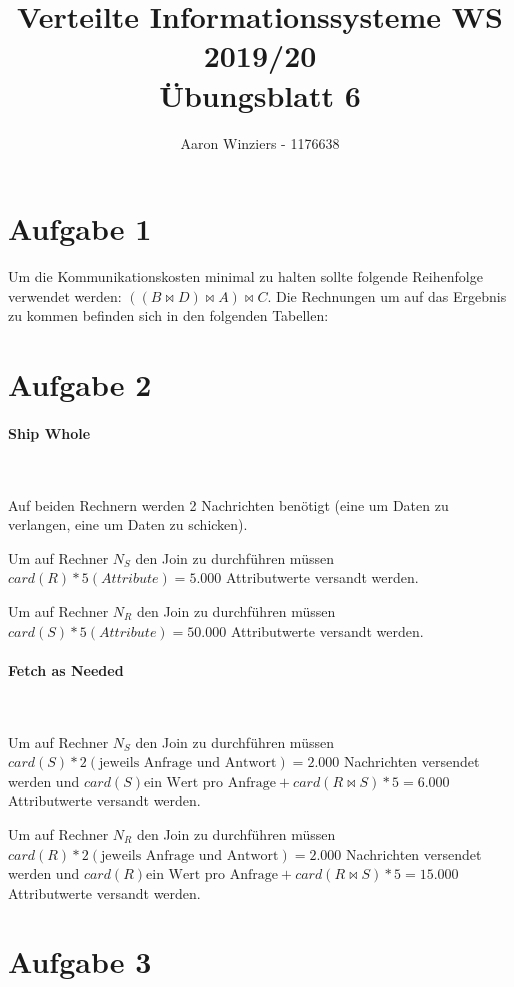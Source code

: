 \documentclass[11pt,a4paper,parskip=half ]{scrartcl}
\author{Aaron Winziers - 1176638}
\title{Verteilte Informationssysteme WS 2019/20\\\LARGE{Übungsblatt 6}}
\begin{document}
	\maketitle
\section*{Aufgabe 1}
	Um die Kommunikationskosten minimal zu halten sollte folgende Reihenfolge verwendet werden: $((B\bowtie D)\bowtie A)\bowtie C$. Die Rechnungen um auf das Ergebnis zu kommen befinden sich in den folgenden Tabellen:
	\begin{landscape}
		\begin{center}
			
		\end{center}
	\end{landscape}


\section*{Aufgabe 2}
\paragraph{Ship Whole}~

	Auf beiden Rechnern werden 2 Nachrichten benötigt (eine um Daten zu verlangen, eine um Daten zu schicken).

	Um auf Rechner $N_{S}$ den Join zu durchführen müssen $card(R)*5(Attribute)=5.000$ Attributwerte versandt werden.

	Um auf Rechner $N_{R}$ den Join zu durchführen müssen $card(S)*5(Attribute)=50.000$ Attributwerte versandt werden.

\paragraph{Fetch as Needed}~
	
	Um auf Rechner $N_{S}$ den Join zu durchführen müssen $card(S)*2 (\text{jeweils Anfrage und Antwort})=2.000$ Nachrichten versendet werden und $card(S)\text{ein Wert pro Anfrage}+card(R\bowtie S)*5 = 6.000$ Attributwerte versandt werden.
	
	Um auf Rechner $N_{R}$ den Join zu durchführen müssen $card(R)*2 (\text{jeweils Anfrage und Antwort})=2.000$ Nachrichten versendet werden und $card(R)\text{ein Wert pro Anfrage}+card(R\bowtie S)*5 = 15.000$ Attributwerte versandt werden.
		
\section*{Aufgabe 3}
\end{document}
